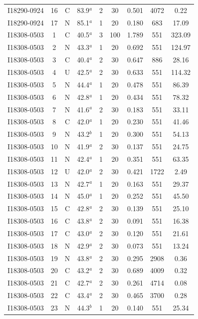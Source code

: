\begin{table}
\begin{tabular}{ccccccccc}
I18290-0924 & 16 & C & 83.9$^{a}$ & 2 & 30 & 0.501 & 4072 & 0.22 \\
I18290-0924 & 17 & N & 85.1$^{a}$ & 1 & 20 & 0.180 & 683 & 17.09 \\
I18308-0503 & 1 & C & 40.5$^{a}$ & 3 & 100 & 1.789 & 551 & 323.09 \\
I18308-0503 & 2 & N & 43.3$^{a}$ & 1 & 20 & 0.692 & 551 & 124.97 \\
I18308-0503 & 3 & C & 40.4$^{a}$ & 2 & 30 & 0.647 & 886 & 28.16 \\
I18308-0503 & 4 & U & 42.5$^{a}$ & 2 & 30 & 0.633 & 551 & 114.32 \\
I18308-0503 & 5 & N & 44.4$^{a}$ & 1 & 20 & 0.478 & 551 & 86.39 \\
I18308-0503 & 6 & N & 42.8$^{a}$ & 1 & 20 & 0.434 & 551 & 78.32 \\
I18308-0503 & 7 & N & 41.6$^{a}$ & 2 & 30 & 0.183 & 551 & 33.11 \\
I18308-0503 & 8 & C & 42.0$^{a}$ & 1 & 20 & 0.230 & 551 & 41.46 \\
I18308-0503 & 9 & N & 43.2$^{b}$ & 1 & 20 & 0.300 & 551 & 54.13 \\
I18308-0503 & 10 & N & 41.9$^{a}$ & 2 & 30 & 0.137 & 551 & 24.75 \\
I18308-0503 & 11 & N & 42.4$^{a}$ & 1 & 20 & 0.351 & 551 & 63.35 \\
I18308-0503 & 12 & U & 42.0$^{a}$ & 2 & 30 & 0.421 & 1722 & 2.49 \\
I18308-0503 & 13 & N & 42.7$^{a}$ & 1 & 20 & 0.163 & 551 & 29.37 \\
I18308-0503 & 14 & N & 45.0$^{a}$ & 1 & 20 & 0.252 & 551 & 45.50 \\
I18308-0503 & 15 & C & 42.8$^{a}$ & 2 & 30 & 0.139 & 551 & 25.10 \\
I18308-0503 & 16 & C & 43.8$^{a}$ & 2 & 30 & 0.091 & 551 & 16.38 \\
I18308-0503 & 17 & C & 43.0$^{a}$ & 2 & 30 & 0.120 & 551 & 21.61 \\
I18308-0503 & 18 & N & 42.9$^{a}$ & 2 & 30 & 0.073 & 551 & 13.24 \\
I18308-0503 & 19 & N & 43.8$^{a}$ & 2 & 30 & 0.295 & 2908 & 0.36 \\
I18308-0503 & 20 & C & 43.2$^{a}$ & 2 & 30 & 0.689 & 4009 & 0.32 \\
I18308-0503 & 21 & C & 42.7$^{a}$ & 2 & 30 & 0.261 & 4714 & 0.08 \\
I18308-0503 & 22 & C & 43.4$^{a}$ & 2 & 30 & 0.465 & 3700 & 0.28 \\
I18308-0503 & 23 & N & 44.3$^{b}$ & 1 & 20 & 0.140 & 551 & 25.34 \\

\end{tabular}
\end{table}
